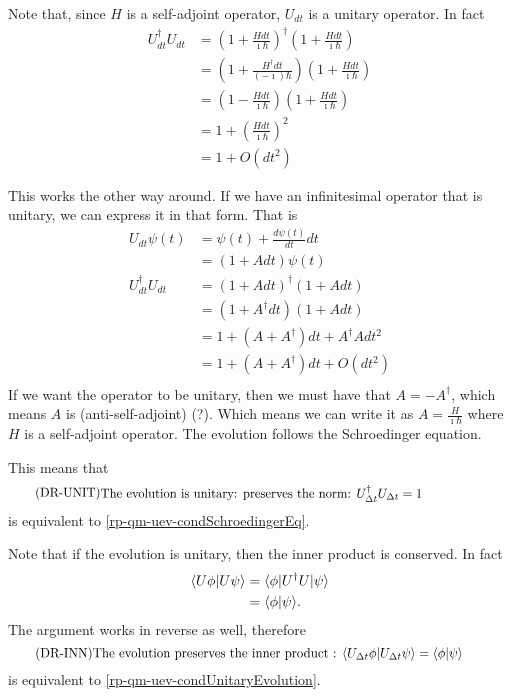 Note that, since $H$ is a self-adjoint operator, $U_{dt}$ is a unitary operator. In fact
\begin{equation}
	\begin{aligned}
		U_{dt}^\dagger U_{dt} &= \left(1 + \frac{H dt}{\imath \hbar}\right)^\dagger \left(1 + \frac{H dt}{\imath \hbar}\right) \\
		&= \left(1 + \frac{H^\dagger dt}{(- \imath) \hbar}\right) \left(1 + \frac{H dt}{\imath \hbar}\right)\\
		&= \left(1 - \frac{H dt}{\imath \hbar}\right) \left(1 + \frac{H dt}{\imath \hbar}\right) \\
		&= 1 + \left(\frac{H dt}{\imath \hbar}\right)^2 \\
		&= 1 + O(dt^2)
	\end{aligned}
\end{equation}

This works the other way around. If we have an infinitesimal operator that is unitary, we can express it in that form. That is
\begin{equation}
	\begin{aligned}
		U_{dt}\psi(t) &= \psi(t) + \frac{d\psi(t)}{dt} dt \\
		&= (1 + A dt)\psi(t) \\
		U_{dt}^\dagger U_{dt} &= \left(1 + A dt\right)^\dagger \left(1 + A dt\right) \\
		&= \left(1 + A^\dagger dt\right) \left(1 + A dt\right)\\
		&= 1 + \left(A + A^\dagger\right)dt + A^\dagger A dt^2 \\
		&= 1 + \left(A + A^\dagger\right)dt + O(dt^2) \\
	\end{aligned}
\end{equation}
If we want the operator to be unitary, then we must have that $A = - A^\dagger $, which means $A$ is (anti-self-adjoint) (?). Which means we can write it as $A = \frac{H}{\imath \hbar}$ where $H$ is a self-adjoint operator. The evolution follows the Schroedinger equation.

This means that 
\begin{equation}\label{rp-qm-uev-condUnitaryEvolution}
	\tag{DR-UNIT}
	\eqtext{The evolution is unitary: preserves the norm: $U^{\dagger}_{\Delta t} U_{\Delta t} = 1$} 
\end{equation}
is equivalent to \ref{rp-qm-uev-condSchroedingerEq}.

Note that if the evolution is unitary, then the inner product is conserved. In fact
\begin{equation}
	\begin{aligned}
		\langle U \phi | U \psi\rangle &= \langle \phi | U^\dagger U | \psi \rangle \\
		&=\langle  \phi | \psi \rangle.
	\end{aligned}
\end{equation}
The argument works in reverse as well, therefore
\begin{equation}\label{rp-qm-uev-condInnerProductPreserved}
	\tag{DR-INN}
	\eqtext{The evolution preserves the inner product : $\< U_{\Delta t} \phi | U_{\Delta t} \psi\> =\<  \phi | \psi \>$} 
\end{equation}
is equivalent to \ref{rp-qm-uev-condUnitaryEvolution}.


